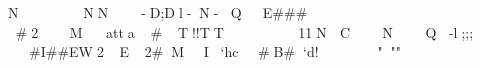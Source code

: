 N			NN		-D;Dl-N-	Q						E###			#2Matta#T!!TT11N				C	N			Q	-l;;;									#I##EW2E2#MI`hc#B#`d!"""%
